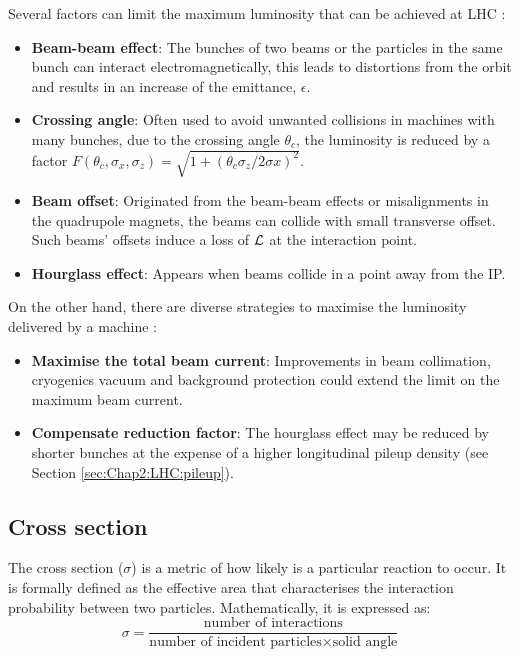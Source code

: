 Several factors can limit the maximum luminosity that can be achieved at LHC \cite{Herr:941318}:
\begin{itemize}
	\item \textbf{Beam-beam effect}: The bunches of two beams or the particles in the same bunch can interact electromagnetically, this leads to distortions from the orbit and results in an increase of the emittance, $\epsilon$.
	\item \textbf{Crossing angle}: Often used to avoid unwanted collisions in machines with many bunches, due to the crossing angle $\theta_c$, 
				the luminosity is reduced by a factor $F(\theta_{c},\sigma_{x},\sigma_{z}) = \sqrt{1+(\theta_{c}\sigma_{z}/2\sigma{x})^2}$.
	\item \textbf{Beam offset}: Originated from the beam-beam effects or misalignments in the quadrupole magnets, the beams can collide with 
				small transverse offset. Such beams' offsets induce a loss of $\mathcal{L}$ at the interaction point.
	\item \textbf{Hourglass effect}: Appears when beams collide in a point away from the IP. 
\end{itemize}

On the other hand, there are diverse strategies to maximise the luminosity delivered by a machine \cite{Hoecker:2016vvy}:
\begin{itemize}
	\item \textbf{Maximise the total beam current}: Improvements in beam collimation, cryogenics vacuum and background protection could extend the limit on the maximum beam current. 
	\item \textbf{Compensate reduction factor}: The hourglass effect may be reduced by shorter bunches at the expense of a higher longitudinal pileup density (see Section \ref{sec:Chap2:LHC:pileup}).
\end{itemize}

\subsection{Cross section}
\label{sec:Chap1:LHC:Cross-Section}
The cross section ($\sigma$) is a metric of how likely is a particular reaction to occur. 
It is formally defined as the effective area that characterises the interaction probability between two particles. 
Mathematically, it is expressed as:
\begin{equation*}
\sigma = \frac{\text{number of interactions}}{\text{number of incident particles}  \times \text{solid angle}}
\end{equation*}


